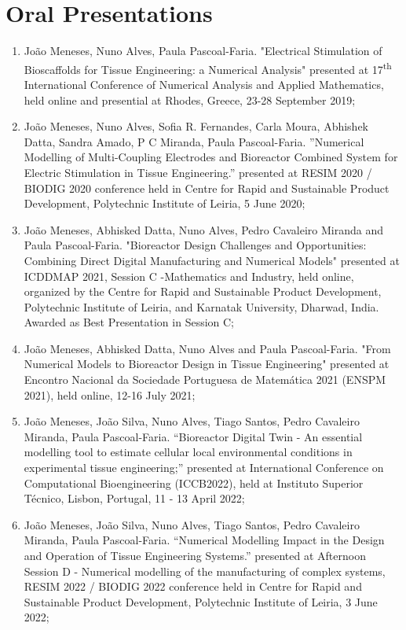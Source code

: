\section{Oral Presentations}
\begin{enumerate}
\item \small João Meneses, Nuno Alves, Paula Pascoal-Faria. "Electrical Stimulation of Bioscaffolds for Tissue Engineering: a Numerical Analysis" presented at 17\textsuperscript{th} International Conference of Numerical Analysis and Applied Mathematics, held online and presential at Rhodes, Greece, 23-28 September 2019;
\item \small João Meneses, Nuno Alves, Sofia R. Fernandes, Carla Moura, Abhishek Datta, Sandra Amado, P C Miranda, Paula Pascoal-Faria. ''Numerical Modelling of Multi-Coupling Electrodes and Bioreactor Combined System for Electric Stimulation in Tissue Engineering.'' presented at RESIM 2020 / BIODIG 2020 conference held in Centre for Rapid and Sustainable Product Development, Polytechnic Institute of Leiria, 5 June 2020;
\item \small João Meneses, Abhisked Datta, Nuno Alves, Pedro Cavaleiro Miranda and Paula Pascoal-Faria. "Bioreactor Design Challenges and Opportunities: Combining Direct Digital Manufacturing and Numerical Models" presented at ICDDMAP 2021, Session C -Mathematics and Industry, held online, organized by the Centre for Rapid and Sustainable Product Development, Polytechnic Institute of Leiria, and Karnatak University, Dharwad, India. Awarded as Best Presentation in Session C;
\item \small João Meneses, Abhisked Datta, Nuno Alves and Paula Pascoal-Faria. "From Numerical Models to Bioreactor Design in Tissue Engineering" presented at Encontro Nacional da Sociedade Portuguesa de Matemática 2021 (ENSPM 2021), held online, 12-16 July 2021;
\item \small João Meneses, João Silva, Nuno Alves, Tiago Santos, Pedro Cavaleiro Miranda, Paula Pascoal-Faria. “Bioreactor Digital Twin - An essential modelling tool to estimate cellular local environmental conditions in experimental tissue engineering;” presented at International Conference on Computational Bioengineering (ICCB2022), held at Instituto Superior Técnico, Lisbon, Portugal, 11 - 13 April 2022;
\item \small João Meneses, João Silva, Nuno Alves, Tiago Santos, Pedro Cavaleiro Miranda, Paula Pascoal-Faria. “Numerical Modelling Impact in the Design and Operation of Tissue Engineering Systems.” presented at Afternoon Session D - Numerical modelling of the manufacturing of complex systems, RESIM 2022 / BIODIG 2022 conference held in Centre for Rapid and Sustainable Product Development, Polytechnic Institute of Leiria, 3 June 2022;

\end{enumerate}
